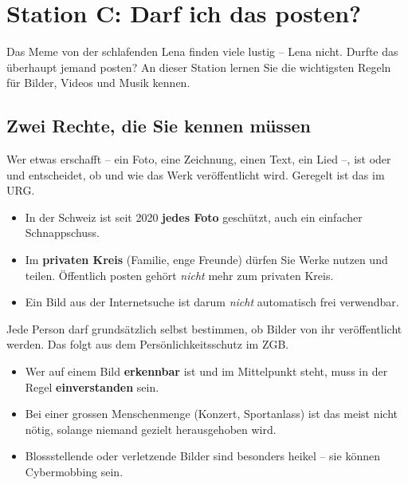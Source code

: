 \chapter{Station C: Darf ich das posten?}\label{ch:posten}

\begin{myremark}
	Das Meme von der schlafenden Lena finden viele lustig -- Lena nicht.
	Durfte das überhaupt jemand posten? An dieser Station lernen Sie die wichtigsten Regeln für Bilder, Videos und Musik kennen.
\end{myremark}

\section{Zwei Rechte, die Sie kennen müssen}

\begin{mysummary}[Urheberrecht]
	Wer etwas erschafft -- ein Foto, eine Zeichnung, einen Text, ein Lied --, ist  oder  und entscheidet, ob und wie das Werk veröffentlicht wird.
	Geregelt ist das im \gls{URG}.
	\begin{itemize}
		\item In der Schweiz ist seit 2020 \textbf{jedes Foto} geschützt, auch ein einfacher Schnappschuss.
		\item Im \textbf{privaten Kreis} (Familie, enge Freunde) dürfen Sie Werke nutzen und teilen.
		      Öffentlich posten gehört \emph{nicht} mehr zum privaten Kreis.
		\item Ein Bild aus der Internetsuche ist darum \emph{nicht} automatisch frei verwendbar.
	\end{itemize}
\end{mysummary}

\begin{mysummary}
	Jede Person darf grundsätzlich selbst bestimmen, ob Bilder von ihr veröffentlicht werden.
	Das folgt aus dem Persönlichkeitsschutz im \gls{ZGB}.
	\begin{itemize}
		\item Wer auf einem Bild \textbf{erkennbar} ist und im Mittelpunkt steht, muss in der Regel \textbf{einverstanden} sein.
		\item Bei einer grossen Menschenmenge (Konzert, Sportanlass) ist das meist nicht nötig, solange niemand gezielt herausgehoben wird.
		\item Blossstellende oder verletzende Bilder sind besonders heikel -- sie können Cybermobbing sein.
	\end{itemize}
\end{mysummary}

